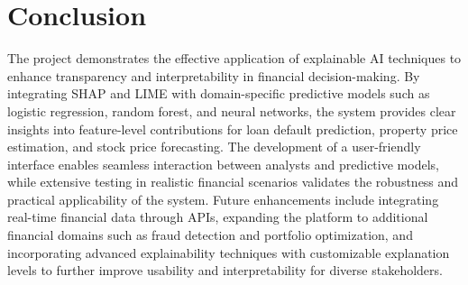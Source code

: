 
\section{Conclusion}

The project demonstrates the effective application of explainable AI techniques to enhance transparency and interpretability in financial decision-making. By integrating SHAP and LIME with domain-specific predictive models such as logistic regression, random forest, and neural networks, the system provides clear insights into feature-level contributions for loan default prediction, property price estimation, and stock price forecasting. The development of a user-friendly interface enables seamless interaction between analysts and predictive models, while extensive testing in realistic financial scenarios validates the robustness and practical applicability of the system. Future enhancements include integrating real-time financial data through APIs, expanding the platform to additional financial domains such as fraud detection and portfolio optimization, and incorporating advanced explainability techniques with customizable explanation levels to further improve usability and interpretability for diverse stakeholders.
